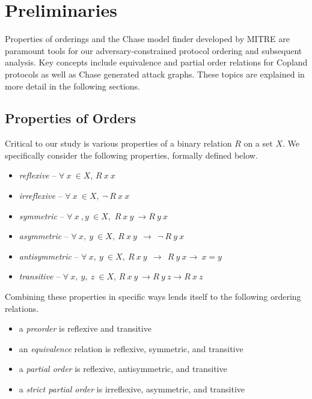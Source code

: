 \documentclass[runningheads]{llncs}
\theoremstyle{definition}
\newcommand{\squash}{\itemsep=0pt\parskip=0pt}
\begin{document}
\section{Preliminaries}

Properties of orderings and the Chase model finder developed by MITRE \cite{Ramsdell:2020:Chase} are paramount tools for our adversary-constrained protocol ordering and subsequent analysis. Key concepts include equivalence and partial order relations for Copland protocols as well as Chase generated attack graphs. These topics are explained in more detail in the following sections.

\subsection*{Properties of Orders}

Critical to our study is various properties of a binary relation $R$ on a set $X$. We specifically consider the following properties, formally defined below.

\begin{itemize}
    \squash
    \item \emph{reflexive} -- $ \forall\: x\: \in X$, $R\: x\: x$
    \item \emph{irreflexive} -- $ \forall \: x\: \in X, \: \neg \: R\: x\: x$
    \item \emph{symmetric} -- $ \forall\: x\: , y\: \in X,$ $R\: x\: y\:\rightarrow R\: y\: x$
    \item \emph{asymmetric} --  $\forall\: x,\: y\:\in X,\: R\: x\: y\:\: \rightarrow  \:\: \neg \:R\: y\: x $  
    \item \emph{antisymmetric} --  $\forall\: x,\: y\:\in X,\: R\: x\: y\:\: \rightarrow \:\: R\: y\: x \rightarrow \:x = y$ 
    \item \emph{transitive} -- $ \forall\: x,\: y,\: z\:\in X$, $R\: x\: y\: \rightarrow R\: y\: z \rightarrow R\: x\: z$
\end{itemize}

\noindent Combining these properties in specific ways lends itself to the following ordering relations.

\begin{itemize}
    \squash
    \item a \emph{preorder} is reflexive and transitive
    \item an \emph{equivalence} relation is reflexive, symmetric, and transitive 
    \item a \emph{partial order} is reflexive, antisymmetric, and transitive 
    \item a \emph{strict partial order} is irreflexive, asymmetric, and transitive 
\end{itemize}
\end{document}
